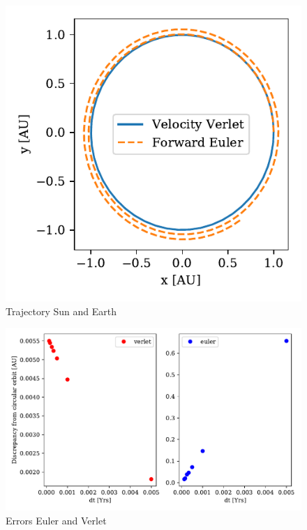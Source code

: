 \documentclass[twocolumn]{aastex62}
\begin{document}
\begin{figure}
\includegraphics[scale=1]{Figures/circularcomparison.pdf}
\caption{Trajectory Sun and Earth}
\label{fig:traj}
\end{figure}

\begin{figure}
\includegraphics[scale=1]{Figures/taskb_errors.pdf}
\caption{Errors Euler and Verlet}
\label{fig:error}
\end{figure}
\end{document}
